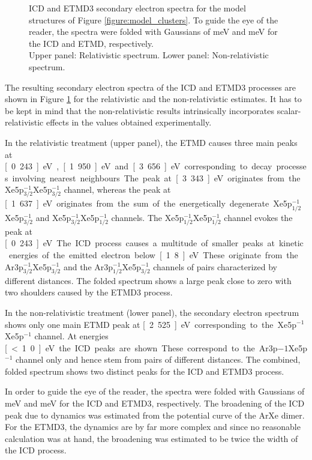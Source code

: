 \begin{figure}[]
 \centering
 
 
 \caption{\ac{ICD} and \ac{ETMD}3 secondary electron spectra for the model
          structures of Figure \ref{figure:model_clusters}. To guide the
          eye of the reader, the spectra
          were folded with Gaussians of \unit[300]{meV} and \unit[600]{meV}
          for the \ac{ICD} and \ac{ETMD}, respectively.\\
          Upper panel: Relativistic spectrum. Lower panel: Non-relativistic
          spectrum.}
 \label{figure:arxe_model}
\end{figure}

The resulting secondary electron spectra of the \ac{ICD} and
\ac{ETMD}3 processes are shown in Figure \ref{figure:arxe_model} for the
relativistic and the non-relativistic estimates.
It has to be kept in mind that the non-relativistic results intrinsically
incorporates scalar-relativistic effects in the values obtained experimentally.

In the relativistic treatment (upper panel), the \ac{ETMD} causes three main
peaks at \unit[0.243]{eV}, \unit[1.950]{eV} and \unit[3.656]{eV}
corresponding to decay
processes involving nearest neighbours. The peak at \unit[3.343]{eV} originates
from the Xe5p$_{3/2}^{-1}$Xe5p$_{3/2}^{-1}$ channel, whereas the peak
at \unit[1.637]{eV} originates from the sum of the energetically degenerate
Xe5p$_{1/2}^{-1}$Xe5p$_{3/2}^{-1}$ and Xe5p$_{3/2}^{-1}$Xe5p$_{1/2}^{-1}$
channels. The Xe5p$_{1/2}^{-1}$Xe5p$_{1/2}^{-1}$ channel evokes the peak
at \unit[0.243]{eV}.
The \ac{ICD} process causes a multitude of smaller peaks at kinetic
energies of the emitted electron below \unit[1.8]{eV}. These originate from the
Ar3p$_{3/2}^{-1}$Xe5p$_{3/2}^{-1}$ and the Ar3p$_{1/2}^{-1}$Xe5p$_{3/2}^{-1}$
channels of pairs characterized by different distances.
The folded spectrum shows a large peak close to zero with two shoulders
caused by the \ac{ETMD}3 process.

In the non-relativistic treatment (lower panel), the secondary
electron spectrum shows only one main \ac{ETMD} peak at \unit[2.525]{eV}
corresponding to the Xe5p$^{-1}$Xe5p$^{-1}$ channel.
At energies \unit[<1.0]{eV} the \ac{ICD} peaks are shown. These correspond
to the Ar3p${-1}$Xe5p$^{-1}$ channel only and hence stem from pairs of
different distances.
The combined, folded spectrum shows two distinct peaks for the \ac{ICD} and
\ac{ETMD}3 process.

In order to guide the eye of the reader, the spectra were folded with
Gaussians of \unit[300]{meV} and \unit[600]{meV}
for the ICD and ETMD3, respectively. The broadening of the ICD peak due
to dynamics was estimated from the potential curve of the ArXe dimer. For
the ETMD3, the dynamics are by far more complex and since no reasonable
calculation was at hand, the broadening was estimated to be twice the width
of the ICD process.

